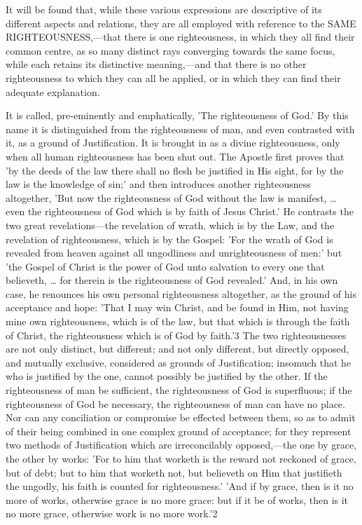 \documentclass[
]{book}
\begin{document}
It will be found that, while these various expressions are descriptive of its different aspects and relations, they are all employed with reference to the SAME RIGHTEOUSNESS,---that there is one righteousness, in which they all find their common centre, as so many distinct rays converging towards the same focus, while each retains its distinctive meaning,---and that there is no other righteousness to which they can all be applied, or in which they can find their adequate explanation.

It is called, pre-eminently and emphatically, 'The righteousness of God.' By this name it is distinguished from the righteousness of man, and even contrasted with it, as a ground of Justification. It is brought in as a divine righteousness, only when all human righteousness has been shut out. The Apostle first proves that 'by the deeds of the law there shall no flesh be justified in His sight, for by the law is the knowledge of sin;' and then introduces another righteousness altogether, 'But now the righteousness of God without the law is manifest, \ldots{} even the righteousness of God which is by faith of Jesus Christ.' He contrasts the two great revelations---the revelation of wrath, which is by the Law, and the revelation of righteousness, which is by the Gospel: 'For the wrath of God is revealed from heaven against all ungodliness and unrighteousness of men:' but 'the Gospel of Christ is the power of God unto salvation to every one that believeth, \ldots{} for therein is the righteousness of God revealed.' And, in his own case, he renounces his own personal righteousness altogether, as the ground of his acceptance and hope: 'That I may win Christ, and be found in Him, not having mine own righteousness, which is of the law, but that which is through the faith of Christ, the righteousness which is of God by faith.'3 The two righteousnesses are not only distinct, but different; and not only different, but directly opposed, and mutually exclusive, considered as grounds of Justification; insomuch that he who is justified by the one, cannot possibly be justified by the other. If the righteousness of man be sufficient, the righteousness of God is superfluous; if the righteousness of God be necessary, the righteousness of man can have no place. Nor can any conciliation or compromise be effected between them, so as to admit of their being combined in one complex ground of acceptance; for they represent two methods of Justification which are irreconcilably opposed,---the one by grace, the other by works: 'For to him that worketh is the reward not reckoned of grace, but of debt; but to him that worketh not, but believeth on Him that justifieth the ungodly, his faith is counted for righteousness.' 'And if by grace, then is it no more of works, otherwise grace is no more grace: but if it be of works, then is it no more grace, otherwise work is no more work.'2
\end{document}
